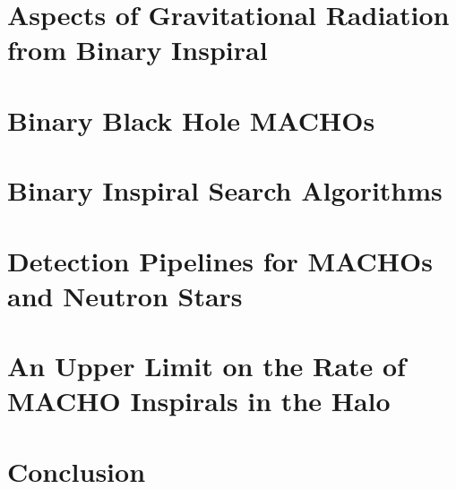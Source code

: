 \documentclass[12pt]{report}
\begin{document}
\chapter{Aspects of Gravitational Radiation from Binary Inspiral}

\chapter{Binary Black Hole MACHOs}

\chapter{Binary Inspiral Search Algorithms}

\chapter{Detection Pipelines for MACHOs and Neutron Stars}

\chapter{An Upper Limit on the Rate of MACHO Inspirals in the Halo}


\chapter{Conclusion}


\clearpage



\clearpage
{}

\begin{startvita}
\end{startvita}

\renewenvironment{thebibliography}[1]%
  {\begin{list}{\labelenumi\hss}%
     {\usecounter{enumi}\setlength{\labelwidth}{3em}%
      \setlength{\leftmargin}{5em}}}%
  {\end{list}}
\renewcommand{\bibitem}[1]{\item\label{#1}\relax}%
\renewcommand{\theenumi}{\arabic{enumi}}%
\begin{publications}
\putbib[papers]
\end{publications}

\finishvita
\end{document}
